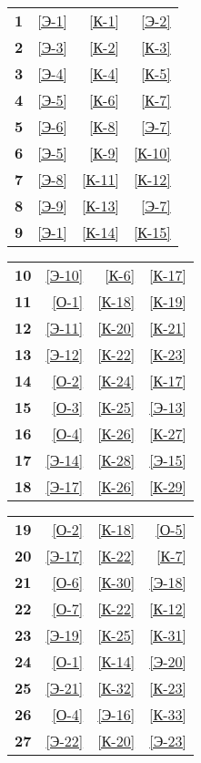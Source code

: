 \documentclass[12pt]{article}
\newcommand{\eR}[1]{\ref{Э-#1}}
\newcommand{\oR}[1]{\ref{О-#1}}
\newcommand{\kR}[1]{\ref{К-#1}}
\begin{document}
\begin{multicols}{3}

\begin{tabular}{c|rrr}
\textbf{1}  & \eR{1} & \kR{1} & \eR{2} \\
\textbf{2}  & \eR{3} & \kR{2} & \kR{3} \\
\textbf{3}  & \eR{4} & \kR{4} & \kR{5} \\
\textbf{4}  & \eR{5} & \kR{6} & \kR{7} \\
\textbf{5}  & \eR{6} & \kR{8} & \eR{7} \\
\textbf{6}  & \eR{5} & \kR{9} & \kR{10} \\
\textbf{7}  & \eR{8} & \kR{11} & \kR{12} \\
\textbf{8}  & \eR{9} & \kR{13} & \eR{7} \\
\textbf{9}  & \eR{1} & \kR{14} & \kR{15} \\
\end{tabular}

\begin{tabular}{c|rrr}
\textbf{10} & \eR{10} & \kR{6} & \kR{17} \\
\textbf{11} & \oR{1} & \kR{18} & \kR{19} \\
\textbf{12} & \eR{11} & \kR{20} & \kR{21} \\
\textbf{13} & \eR{12} & \kR{22} & \kR{23} \\
\textbf{14} & \oR{2} & \kR{24} & \kR{17} \\
\textbf{15} & \oR{3} & \kR{25} & \eR{13} \\
\textbf{16} & \oR{4} & \kR{26} & \kR{27} \\
\textbf{17} & \eR{14} & \kR{28} & \eR{15} \\
\textbf{18} & \eR{17} & \kR{26} & \kR{29} \\
\end{tabular}

\begin{tabular}{c|rrr}
\textbf{19} & \oR{2} & \kR{18} & \oR{5} \\
\textbf{20} & \eR{17} & \kR{22} & \kR{7} \\
\textbf{21} & \oR{6} & \kR{30} & \eR{18} \\
\textbf{22} & \oR{7} & \kR{22} & \kR{12} \\
\textbf{23} & \eR{19} & \kR{25} & \kR{31} \\
\textbf{24} & \oR{1} & \kR{14} & \eR{20} \\
\textbf{25} & \eR{21} & \kR{32} & \kR{23} \\
\textbf{26} & \oR{4} & \eR{16} & \kR{33} \\
\textbf{27} & \eR{22} & \kR{20} & \eR{23} \\
\end{tabular}

\end{multicols}
\end{document}
